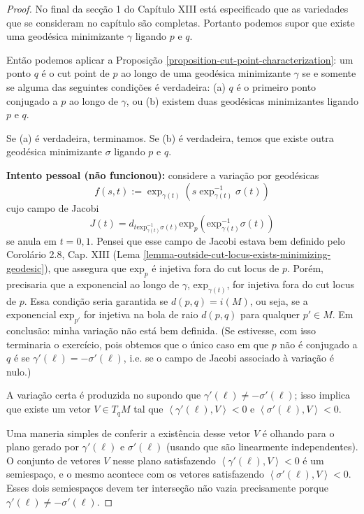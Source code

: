 \begin{proof}
No final da secção 1 do Capítulo XIII está especificado que as variedades que se
consideram no capítulo são completas. Portanto podemos supor que existe
uma geodésica minimizante $\gamma$ ligando $p$ e $q$.

Então podemos aplicar a Proposição \ref{proposition-cut-point-characterization}:
 um ponto $q$ é o cut point de $p$ ao longo de uma 
geodésica minimizante $\gamma$ se e somente se
alguma das seguintes condições é verdadeira: 
(a) $q$ é o primeiro ponto conjugado a $p$ ao longo de $\gamma$, ou 
(b) existem duas geodésicas minimizantes ligando $p$ e $q$.

Se (a) é verdadeira, terminamos. Se (b) é verdadeira, temos que existe outra
geodésica minimizante $\sigma$ ligando $p$ e $q$.

{\bf Intento pessoal (não funcionou):}  considere a variação por geodésicas 
$$
f(s,t):=\operatorname{exp}_{\gamma(t)}
(s\operatorname{exp}_{\gamma(t)}^{-1}\sigma(t))
$$
cujo campo de Jacobi 
$$
J(t)=d_{t\text{exp}_{\gamma(t)}^{-1}\sigma(t)}
\text{exp}_p(\text{exp}_{\gamma(t)}^{-1}\sigma(t))
$$
se anula em $t=0,1$. Pensei que esse campo de Jacobi estava bem definido pelo 
Corolário 2.8, Cap. XIII (Lema 
\ref{lemma-outside-cut-locus-exists-minimizing-geodesic}), que assegura
 que $\text{exp}_p$ é injetiva fora do cut locus de $p$. Porém, precisaria
 que a exponencial ao longo de $\gamma$,
 $\text{exp}_{\gamma(t)}$, for injetiva fora do cut locus de $p$. 
Essa condição seria garantida se $d(p,q)=i(M)$, ou seja, se a exponencial
 $\text{exp}_{p'}$ for injetiva na bola de raio $d(p,q)$ para qualquer 
$p' \in M$. Em conclusão: minha variação não está bem definida. 
(Se estivesse, com
isso terminaria o exercício, pois obtemos que o único caso em que $p$ não é
conjugado a $q$ é se $\gamma'(\ell)=-\sigma'(\ell)$, i.e. se o campo de Jacobi 
associado à variação é nulo.) 

\bigskip

A variação certa é produzida no \cite{doc} supondo que 
$\gamma'(\ell)\neq -\sigma'(\ell)$; isso implica que existe um vetor
 $V \in T_q M$ tal que 
$\left<\gamma'(\ell),V\right>< 0$ e $\left<\sigma'(\ell),V\right>< 0$.

Uma maneria simples de conferir a existência desse vetor $V$ é olhando para o 
plano gerado por $\gamma'(\ell)$ e $\sigma'(\ell)$ (usando que são linearmente
independentes). O conjunto de vetores $V$ nesse plano satisfazendo 
$\left<\gamma'(\ell),V\right><0$ é um semiespaço, e o mesmo acontece com 
 os vetores satisfazendo $\left<\sigma'(\ell),V\right><0$. Esses dois semiespaços
devem ter interseção não vazia precisamente porque 
$\gamma'(\ell)\neq -\sigma'(\ell)$.


\end{proof}
